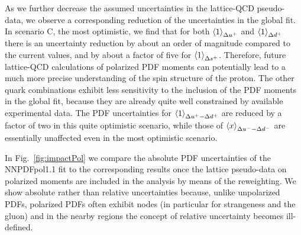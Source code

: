 As we further decrease the assumed uncertainties in the lattice-QCD
pseudo-data, we observe a corresponding reduction of the uncertainties
in the global fit.
%
In scenario C, the most optimistic, we find that for both
$\left\langle 1\right\rangle_{\Delta u^+}$ and $\left\langle 1\right\rangle_{\Delta d^+}$ there is an uncertainty
reduction by about an order of magnitude compared to the current values,
and by about a factor of five for $\left\langle 1\right\rangle_{\Delta s^+}$.
%
Therefore, future lattice-QCD calculations of
polarized PDF moments can potentially lead to a much more
precise understanding of the spin structure of the proton.
%
The other quark combinations exhibit less sensitivity to the inclusion
of the PDF moments in the global fit, because
they are already quite well constrained by available experimental
data.
%
The PDF uncertainties for  $\left\langle 1\right\rangle_{\Delta u^+ - \Delta d^+}$
are reduced by a factor of two in this quite optimistic scenario, while
those of $\left\langle x\right\rangle_{\Delta u^--\Delta d^-}$ are essentially unaffected even
in the most optimistic scenario.

In Fig.~\ref{fig:impactPol} we compare the absolute PDF uncertainties
of the NNPDFpol1.1 fit to the corresponding results once the lattice 
pseudo-data on polarized moments are included in the analysis by means of the
reweighting.
%
We show absolute rather than relative uncertainties
because, unlike unpolarized PDFs, polarized PDFs often exhibit nodes
(in particular for strangeness and the gluon) and in the nearby regions
the concept of relative uncertainty becomes ill-defined.
  
